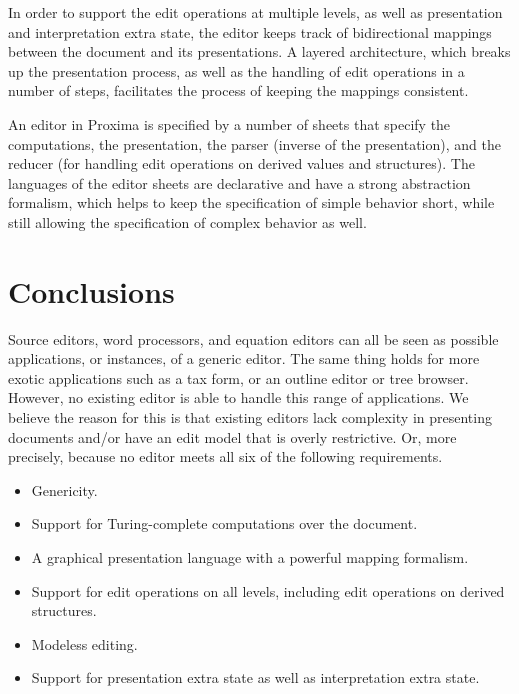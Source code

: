 In order to support the edit operations at multiple levels, as well as presentation and interpretation extra state, the editor keeps track of bidirectional mappings between the document and its presentations. A layered architecture, which breaks up the presentation process, as well as the handling of edit operations in a number of steps, facilitates the process of keeping the mappings consistent. 


An editor in Proxima is specified by a number of sheets that specify the computations, the presentation, the parser (inverse of the presentation), and the reducer (for handling edit operations on derived values and structures). The languages of the editor sheets are declarative and have a strong abstraction formalism, which helps to keep the specification of simple behavior short, while still allowing the specification of complex behavior as well.

\section{Conclusions}

Source editors, word processors, and equation editors can all be seen as possible applications, or instances, of a generic editor.  The same thing holds for more exotic applications such as a tax form, or an outline editor or tree browser. However, no existing editor is able to handle this range of applications. We believe the reason for this is that existing editors lack complexity in presenting documents and/or have an edit model that is overly restrictive. Or, more precisely, because no editor meets all six of the following requirements.

\begin{itemize}
\item Genericity.
\item Support for Turing-complete computations over the document.
\item A graphical presentation language with a powerful mapping formalism.
\item Support for edit operations on all levels, including edit operations on derived structures.
\item Modeless editing.
\item Support for presentation extra state as well as interpretation extra state.
\end{itemize}

